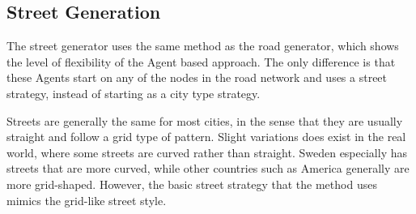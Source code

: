 \subsection{Street Generation}
The street generator uses the same method as the road generator, which shows the level of flexibility of the Agent based approach.
The only difference is that these Agents start on any of the nodes in the road network and uses a street strategy, instead of starting as a city type strategy.

Streets are generally the same for most cities, in the sense that they are usually straight and follow a grid type of pattern.
Slight variations does exist in the real world, where some streets are curved rather than straight.
Sweden especially has streets that are more curved, while other countries such as America generally are more grid-shaped.
However, the basic street strategy that the method uses mimics the grid-like street style.
